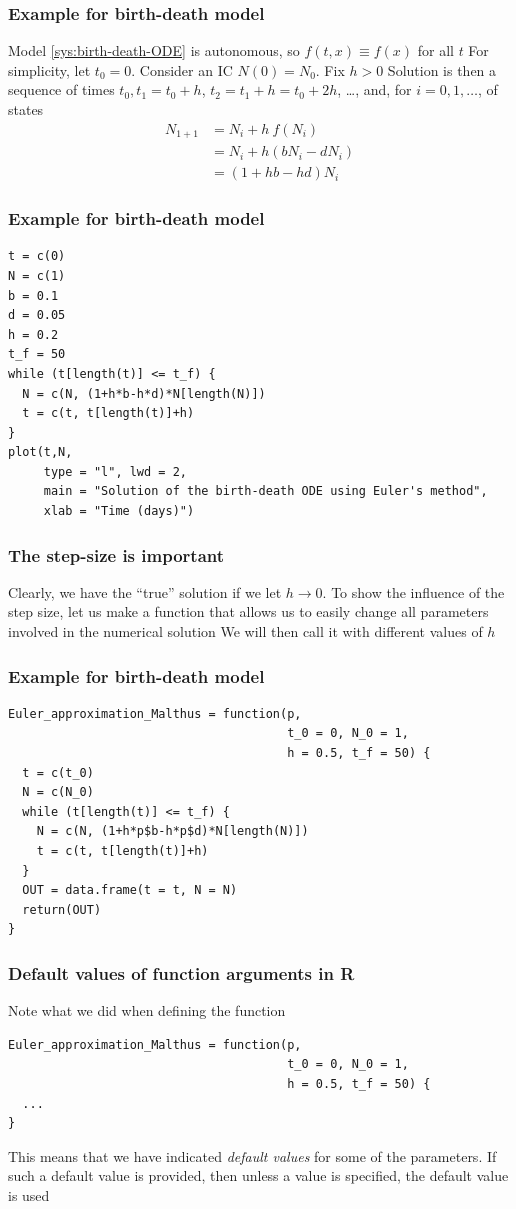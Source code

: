 \documentclass[aspectratio=169]{beamer}
\begin{document}
\begin{frame}\frametitle{Example for birth-death model}
Model \eqref{sys:birth-death-ODE} is autonomous, so $f(t,x)\equiv f(x)$ for all $t$
\vfill
For simplicity, let $t_0=0$. Consider an IC $N(0)=N_0$. Fix $h>0$
\vfill
Solution is then a sequence of times $t_0, t_1=t_0+h$, $t_2=t_1+h=t_0+2h$, \ldots, and, for $i=0,1,\ldots$, of states 
\begin{align*}
N_{1+1} &= N_i+h\ f(N_i) \\
&= N_i+h(bN_i-dN_i) \\
&= (1+hb-hd)N_i
\end{align*}
\end{frame}



\begin{frame}[fragile]\frametitle{Example for birth-death model}
\begin{lstlisting}
t = c(0)
N = c(1)
b = 0.1
d = 0.05
h = 0.2
t_f = 50
while (t[length(t)] <= t_f) {
  N = c(N, (1+h*b-h*d)*N[length(N)])
  t = c(t, t[length(t)]+h)
}
plot(t,N, 
     type = "l", lwd = 2,
     main = "Solution of the birth-death ODE using Euler's method",
     xlab = "Time (days)")
\end{lstlisting}
\end{frame}



\begin{frame}\frametitle{The step-size is important}
Clearly, we have the ``true'' solution if we let $h\to 0$. To show the influence of the step size, let us make a function that allows us to easily change all parameters involved in the numerical solution
\vfill
We will then call it with different values of $h$
\end{frame}

\begin{frame}[fragile]\frametitle{Example for birth-death model}
\begin{lstlisting}
Euler_approximation_Malthus = function(p, 
                                       t_0 = 0, N_0 = 1, 
                                       h = 0.5, t_f = 50) {
  t = c(t_0)
  N = c(N_0)
  while (t[length(t)] <= t_f) {
    N = c(N, (1+h*p$b-h*p$d)*N[length(N)])
    t = c(t, t[length(t)]+h)
  }
  OUT = data.frame(t = t, N = N)
  return(OUT)
}
\end{lstlisting}
\end{frame}

\begin{frame}[fragile]\frametitle{Default values of function arguments in R}
Note what we did when defining the function
\vfill
\begin{lstlisting}
Euler_approximation_Malthus = function(p, 
                                       t_0 = 0, N_0 = 1, 
                                       h = 0.5, t_f = 50) {
  ...
}
\end{lstlisting}
\vfill
This means that we have indicated \emph{default values} for some of the parameters. If such a default value is provided, then unless a value is specified, the default value is used
\end{frame}
\end{document}
